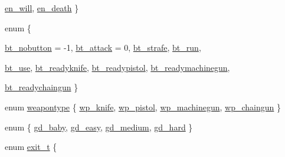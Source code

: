 \begin{DoxyCompactItemize}
\par
\hyperlink{WL__DEF_8H_a170079e8c026d22e4de4683611bc7a50a132f12685e1f94b9fba2bcb226645dd6}{en\_\-will}, 
\hyperlink{WL__DEF_8H_a170079e8c026d22e4de4683611bc7a50ae1121c5d71f8e2017674991a4699d7a8}{en\_\-death}
 \}
\item 
enum \{ \par
\hyperlink{WL__DEF_8H_abc6126af1d45847bc59afa0aa3216b04a613a1d2fa92301ccc1b7093ca72d6e8e}{bt\_\-nobutton} = -\/1, 
\hyperlink{WL__DEF_8H_abc6126af1d45847bc59afa0aa3216b04acebd7a09e68c2effbf7f28b644170c56}{bt\_\-attack} = 0, 
\hyperlink{WL__DEF_8H_abc6126af1d45847bc59afa0aa3216b04aae960fabf9ff1eb088e8c7f88833da62}{bt\_\-strafe}, 
\hyperlink{WL__DEF_8H_abc6126af1d45847bc59afa0aa3216b04ad38125f228ac41ce808d79f56083f6f7}{bt\_\-run}, 
\par
\hyperlink{WL__DEF_8H_abc6126af1d45847bc59afa0aa3216b04a3de1e207640fcdf8dce9c6673ede3f9d}{bt\_\-use}, 
\hyperlink{WL__DEF_8H_abc6126af1d45847bc59afa0aa3216b04a7a7e556f2064ebcc20e9619bd86d04e4}{bt\_\-readyknife}, 
\hyperlink{WL__DEF_8H_abc6126af1d45847bc59afa0aa3216b04a56c6afd511174089c09d612cd55eb256}{bt\_\-readypistol}, 
\hyperlink{WL__DEF_8H_abc6126af1d45847bc59afa0aa3216b04a12905c74028056e1bc966e9c3bac20e6}{bt\_\-readymachinegun}, 
\par
\hyperlink{WL__DEF_8H_abc6126af1d45847bc59afa0aa3216b04aec68a8b4f4bf378e20174bfc1374e9b6}{bt\_\-readychaingun}
 \}
\item 
enum \hyperlink{WL__DEF_8H_a77fc87e9e9605c209948b3e6e66efd70}{weapontype} \{ \hyperlink{WL__DEF_8H_a77fc87e9e9605c209948b3e6e66efd70a1ad286f2c4e8838d0a27bef1ebee5465}{wp\_\-knife}, 
\hyperlink{WL__DEF_8H_a77fc87e9e9605c209948b3e6e66efd70a4807b8dc035672bd83185ad3f0d7a019}{wp\_\-pistol}, 
\hyperlink{WL__DEF_8H_a77fc87e9e9605c209948b3e6e66efd70ab747eb89828952390e8d0185b6c3bff4}{wp\_\-machinegun}, 
\hyperlink{WL__DEF_8H_a77fc87e9e9605c209948b3e6e66efd70acd0249db37ca16fe4745d60a41728eb2}{wp\_\-chaingun}
 \}
\item 
enum \{ \hyperlink{WL__DEF_8H_adc29c2ff13d900c2f185ee95427fb06ca195bf8c5a62b17017cce1ef4e7ec0f36}{gd\_\-baby}, 
\hyperlink{WL__DEF_8H_adc29c2ff13d900c2f185ee95427fb06ca1195148036241b0641cc12dfda4514a6}{gd\_\-easy}, 
\hyperlink{WL__DEF_8H_adc29c2ff13d900c2f185ee95427fb06cab6a0e4ea20dafa8f4046c198008fc3cd}{gd\_\-medium}, 
\hyperlink{WL__DEF_8H_adc29c2ff13d900c2f185ee95427fb06ca694fa1eb317aa8dde4b5780267268f07}{gd\_\-hard}
 \}
\item 
enum \hyperlink{WL__DEF_8H_a1f5fa69e42ee452aa28c256fd25c33cf}{exit\_\-t} \{ \par

\end{DoxyCompactItemize}
